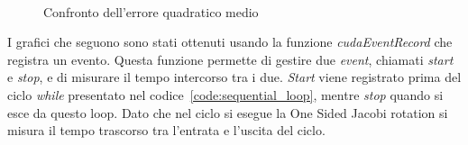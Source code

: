 \begin{figure}[H]
	\centering
	 \\
	\caption{Confronto dell'errore quadratico medio}
\end{figure}
I grafici che seguono sono stati ottenuti usando la funzione \textit{cudaEventRecord} che registra un evento. Questa funzione permette di gestire due \textit{event}, chiamati \textit{start} e \textit{stop}, e di misurare il tempo intercorso tra i due. \textit{Start} viene registrato prima del ciclo \textit{while} presentato nel codice~\ref{code:sequential_loop}, mentre \textit{stop} quando si esce da questo loop. Dato che nel ciclo si esegue la One Sided Jacobi rotation si misura il tempo trascorso tra l'entrata e l'uscita del ciclo.

